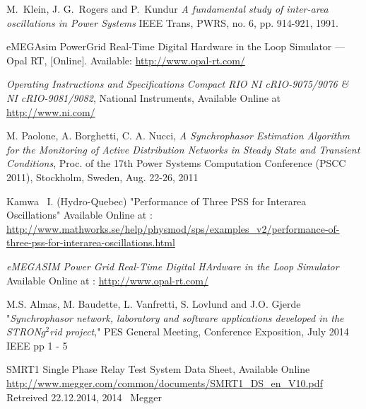 \documentclass[conference]{IEEEtran}
\begin{document}
\begin{thebibliography}{1}
M.~Klein, J. G.~Rogers and P.~Kundur \emph{A fundamental study of inter-area oscillations in Power Systems} IEEE Trans, PWRS, no. 6, pp. 914-921, 1991.

 eMEGAsim PowerGrid Real-Time Digital Hardware in the Loop Simulator — Opal RT, [Online]. Available: \url{http://www.opal-rt.com/}

 \emph{Operating Instructions and Specifications Compact RIO NI cRIO-9075/9076 \& NI cRIO-9081/9082}, National Instruments, Available Online at \url{http://www.ni.com/}

 M. Paolone, A. Borghetti, C. A. Nucci, \emph{A Synchrophasor Estimation Algorithm for the Monitoring of Active Distribution Networks in Steady State and Transient Conditions}, Proc. of the 17th Power Systems Computation Conference (PSCC 2011), Stockholm, Sweden, Aug. 22-26, 2011 

 Kamwa \ I. (Hydro-Quebec) "Performance of Three PSS for Interarea Oscillations" Available Online at : \url{http://www.mathworks.se/help/physmod/sps/examples_v2/performance-of-three-pss-for-interarea-oscillations.html}

 \emph{eMEGASIM Power Grid Real-Time Digital HArdware in the Loop Simulator} Available Online at : \url{http://www.opal-rt.com/}


 M.S. Almas, M. Baudette, L. Vanfretti, S. Lovlund and J.O. Gjerde "\emph{Synchrophasor network, laboratory and software applications developed in the STRON$g^{2}$rid project}," PES General Meeting, Conference Exposition, July 2014 IEEE pp 1 - 5

 SMRT1 Single Phase Relay Test System Data Sheet, Available Online \url{http://www.megger.com/common/documents/SMRT1_DS_en_V10.pdf} Retreived 22.12.2014, 2014 \textcopyright~Megger




\end{thebibliography}
\end{document}
